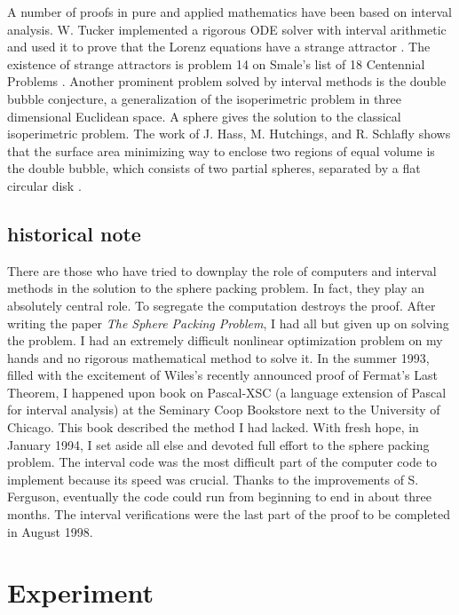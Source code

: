A number of proofs in pure and applied mathematics have been based on interval analysis.  W. Tucker implemented a rigorous ODE solver with interval
arithmetic and used it to prove that the Lorenz equations
have a strange attractor \cite{Tuc02}. The existence of strange attractors is problem 14 on Smale's list
of 18 Centennial Problems \cite{Sma98}.  Another prominent problem solved
by interval methods is the double bubble conjecture, a generalization of
the isoperimetric problem in three dimensional Euclidean space.  A
sphere gives the solution to the classical isoperimetric problem.  The
work of J. Hass, M. Hutchings, and R. Schlafly shows that the surface
area minimizing way to enclose two regions of equal volume is the double
bubble, which consists of two partial spheres, separated by a flat 
circular disk \cite{HHS95}.






\subsection{historical note}

There are those who have tried to downplay the role of computers and interval
methods in the solution to the sphere packing problem.  In fact,
they play an absolutely central role.  To segregate the
computation destroys the proof.
After writing the paper {\it The Sphere Packing Problem}, I had all but given up
on solving the problem.  I had an extremely difficult nonlinear optimization problem
on my hands and no rigorous mathematical method to solve it.  In the summer  1993, 
filled with the excitement of Wiles's recently announced proof of Fermat's Last Theorem,
I happened upon
book on Pascal-XSC (a language extension of Pascal for interval analysis)
at the Seminary Coop Bookstore next to the University of
Chicago.  This book described the method I had lacked.
With fresh hope, in January 1994, 
I set aside all else and devoted full
effort to the sphere packing problem.   The interval code was the most difficult part of the computer code to implement because its speed was crucial.  Thanks to the improvements of S. Ferguson, eventually
the code could run from beginning to end in about three months.  
The interval verifications were the last part of the proof to be completed in August 1998. 


\clearpage
\section{Experiment}
\label{sec:experiment}



